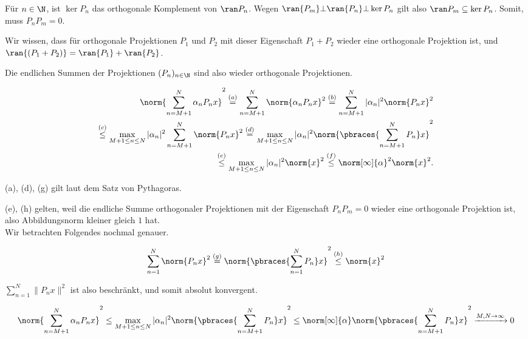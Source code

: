 \begin{solution}

Für $n \in \N$, ist $\ker{P_n}$ das orthogonale Komplement von $\ran P_n$.
Wegen $\ran{P_m} \bot \ran{P_n} \bot \ker{P_n}$ gilt also $\ran P_m \subseteq \ker P_n$.
Somit, muss $P_n P_m = 0$.

Wir wissen, dass für orthogonale Projektionen $P_1$ und $P_2$ mit dieser Eigenschaft $P_1 + P_2$ wieder eine orthogonale Projektion ist, und $\ran{(P_1 + P_2)} = \ran{P_1} + \ran{P_2}$.

Die endlichen Summen der Projektionen $(P_n)_{n \in \N}$ sind also wieder orthogonale Projektionen.

\begin{align*}
    \norm{\sum_{n = M+1}^N \alpha_n P_n x}^2
    \stackrel{(a)}{=}
    \sum_{n = M+1}^N \norm{\alpha_n P_n x}^2
    \stackrel{(b)}{=}
    \sum_{n = M+1}^N |\alpha_n|^2 \norm{P_n x}^2 \\
    \stackrel{(c)}{\leq}
    \max_{M+1 \leq n \leq N} |\alpha_n|^2 \sum_{n = M+1}^N \norm{P_n x}^2
    \stackrel{(d)}{=}
    \max_{M+1 \leq n \leq N} |\alpha_n|^2 \norm{\pbraces{\sum_{n = M+1}^N P_n} x}^2 \\
    \stackrel{(e)}{\leq}
    \max_{M+1 \leq n \leq N} |\alpha_n|^2 \norm{x}^2
    \stackrel{(f)}{\leq}
    \norm[\infty]{\alpha}^2 \norm{x}^2.
\end{align*}

(a), (d), (g) gilt laut dem Satz von Pythagoras.

(e), (h) gelten, weil die endliche Summe orthogonaler Projektionen mit der Eigenschaft $P_n P_m = 0$ wieder eine orthogonale Projektion ist, also Abbildungsnorm kleiner gleich $1$ hat. \\

Wir betrachten Folgendes nochmal genauer.

\begin{align*}
    \sum_{n = 1}^N \norm{P_n x}^2
    \stackrel{(g)}{=}
    \norm{\pbraces{\sum_{n = 1}^N P_n} x}^2
    \stackrel{(h)}{\leq}
    \norm{x}^2
\end{align*}

$\sum_{n = 1}^N \| P_n x \|^2$ ist also beschränkt, und somit absolut konvergent.

\begin{align*}
  \norm{\sum_{n = M+1}^N \alpha_n P_n x}^2
  \leq
  \max_{M+1 \leq n \leq N} |\alpha_n|^2 \norm{\pbraces{\sum_{n = M+1}^N P_n} x}^2
  \leq
  \norm[\infty]{\alpha} \norm{\pbraces{\sum_{n = M+1}^N P_n} x}^2
  \xrightarrow{M, N \rightarrow \infty} 0
\end{align*}


\end{solution}

